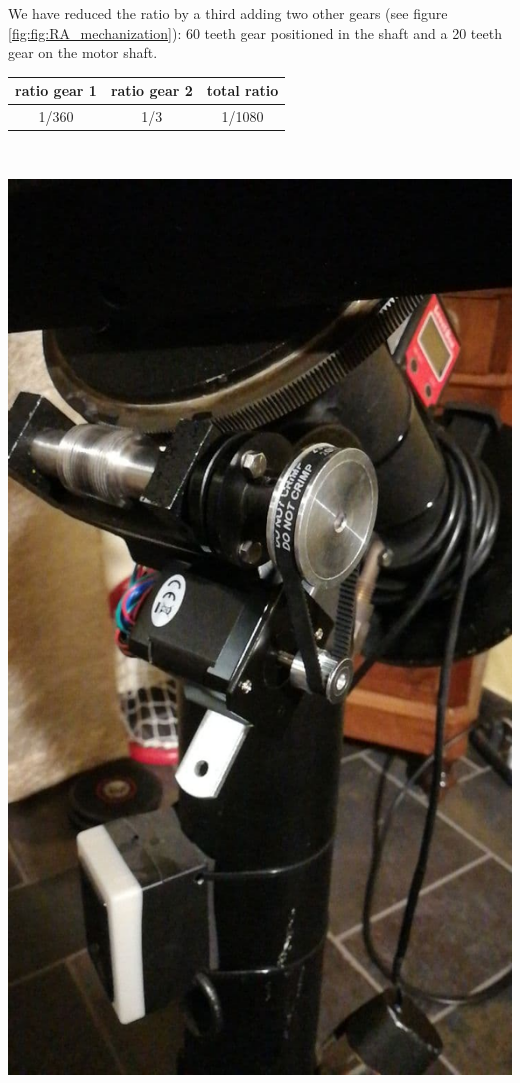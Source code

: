 \documentclass{article}
\begin{document}
\begin{multicols}{2}
        We have reduced the ratio by a third adding two other gears (see figure \ref{fig:fig:RA_mechanization}): 60 teeth gear positioned in the shaft and a 20 teeth gear on the motor shaft.
        \\
        \begin{minipage}{.5\textwidth}
            \centering
            \begin{tabular}{cc|c}
                ratio gear 1 & ratio gear 2 & total ratio \\
                \hline
                1/360 & 1/3 & 1/1080 \\
                \hline
            \end{tabular}
            \label{tab:RA_mechanization}
        \end{minipage}
        \\
        \begin{minipage}{.5\textwidth}
            \centering
            \includegraphics[scale=0.5]{images/RA_motorization.jpg}  

\end{minipage}
\end{multicols}
\end{document}

